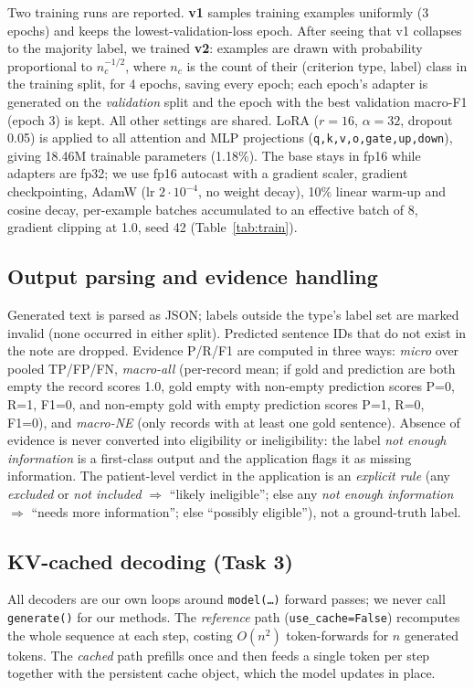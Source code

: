 \documentclass[conference]{IEEEtran}
\begin{document}
Two training runs are reported. \textbf{v1} samples training examples uniformly (3 epochs) and keeps the lowest-validation-loss epoch. After seeing that v1 collapses to the majority label, we trained \textbf{v2}: examples are drawn with probability proportional to $n_c^{-1/2}$, where $n_c$ is the count of their (criterion type, label) class in the training split, for 4 epochs, saving every epoch; each epoch's adapter is generated on the \emph{validation} split and the epoch with the best validation macro-F1 (epoch 3) is kept. All other settings are shared. LoRA ($r{=}16$, $\alpha{=}32$, dropout 0.05) is applied to all attention and MLP projections (\texttt{q,k,v,o,gate,up,down}), giving 18.46M trainable parameters (1.18\%). The base stays in fp16 while adapters are fp32; we use fp16 autocast with a gradient scaler, gradient checkpointing, AdamW (lr $2\cdot10^{-4}$, no weight decay), 10\% linear warm-up and cosine decay, per-example batches accumulated to an effective batch of 8, gradient clipping at 1.0, seed 42 (Table~\ref{tab:train}).

\subsection{Output parsing and evidence handling}
Generated text is parsed as JSON; labels outside the type's label set are marked invalid (none occurred in either split). Predicted sentence IDs that do not exist in the note are dropped. Evidence P/R/F1 are computed in three ways: \emph{micro} over pooled TP/FP/FN, \emph{macro-all} (per-record mean; if gold and prediction are both empty the record scores 1.0, gold empty with non-empty prediction scores P=0, R=1, F1=0, and non-empty gold with empty prediction scores P=1, R=0, F1=0), and \emph{macro-NE} (only records with at least one gold sentence). Absence of evidence is never converted into eligibility or ineligibility: the label \emph{not enough information} is a first-class output and the application flags it as missing information. The patient-level verdict in the application is an \emph{explicit rule} (any \emph{excluded} or \emph{not included} $\Rightarrow$ ``likely ineligible''; else any \emph{not enough information} $\Rightarrow$ ``needs more information''; else ``possibly eligible''), not a ground-truth label.

\subsection{KV-cached decoding (Task 3)}
All decoders are our own loops around \texttt{model(\dots)} forward passes; we never call \texttt{generate()} for our methods. The \emph{reference} path (\texttt{use\_cache=False}) recomputes the whole sequence at each step, costing $O(n^2)$ token-forwards for $n$ generated tokens. The \emph{cached} path prefills once and then feeds a single token per step together with the persistent cache object, which the model updates in place.
\end{document}
